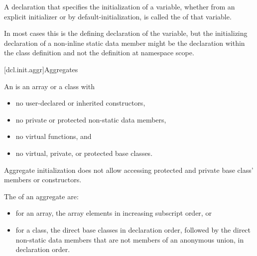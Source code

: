 \pnum
A declaration that specifies the initialization of a variable,
whether from an explicit initializer or by default-initialization,
is called the  of that variable.
\begin{note}
In most cases
this is the defining declaration of the variable,
but the initializing declaration
of a non-inline static data member
might be the declaration within the class definition
and not the definition at namespace scope.
\end{note}

[dcl.init.aggr]{Aggregates}%
%
%
%
%
%
%

\pnum
An  is an array or a class with
\begin{itemize}
\item
no user-declared or inherited constructors,
\item
no private or protected non-static data members,
\item
no virtual functions, and
\item
no virtual, private, or protected base classes.
\end{itemize}
\begin{note}
Aggregate initialization does not allow accessing
protected and private base class' members or constructors.
\end{note}

\pnum
The  of an aggregate are:
\begin{itemize}
\item
for an array, the array elements in increasing subscript order, or
\item
for a class, the direct base classes in declaration order,
followed by the direct non-static data members
that are not members of an anonymous union, in declaration order.
\end{itemize}

